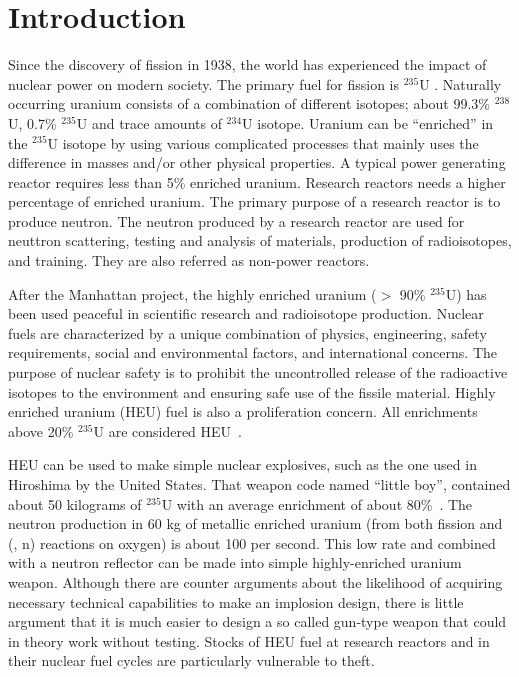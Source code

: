 \chapter{Introduction}
Since the discovery of fission in 1938, the world has experienced the impact of nuclear power on modern society. The primary fuel for fission is $^{235}$U . Naturally occurring uranium consists of a combination of different isotopes; about 99.3\% $^{238}$U,  0.7\% $^{235}$U and trace amounts of $^{234}$U isotope. Uranium can be ``enriched'' in the $^{235}$U isotope by using various complicated processes that mainly uses the difference in masses and/or other physical properties. A typical power generating reactor requires less than 5\% enriched uranium. Research reactors needs a higher percentage of enriched uranium. The primary purpose of a research reactor is to produce neutron. The neutron produced by a research reactor are used for neuttron scattering, testing and analysis of materials, production of radioisotopes, and training.
 They are also referred as non-power reactors.


After the Manhattan project, the highly enriched uranium ($>$ 90\% $^{235}$U) has been used peaceful in scientific research and radioisotope production. Nuclear fuels are characterized by a unique combination of physics, engineering, safety requirements, social and environmental factors, and international concerns. The purpose of nuclear safety is to prohibit the uncontrolled release of the radioactive isotopes to the environment and ensuring safe use of the fissile material. Highly enriched uranium (HEU) fuel is also a proliferation concern. All enrichments above 20\% $^{235}$U are considered HEU~\cite{international2005iaea}.

HEU can be used to make simple nuclear explosives, such as the one used in Hiroshima by the United States. That weapon code named ``little boy'', contained about 50 kilograms of $^{235}$U with an average enrichment of about 80\%~\cite{serber1992alamos}. The neutron production in 60 kg of metallic enriched uranium (from both fission and (\textalpha, n) reactions on oxygen) is about 100 per second. This low rate and combined with a neutron reflector can be made into simple highly-enriched uranium weapon. Although there are counter arguments about the likelihood of acquiring necessary technical capabilities to make an implosion design, there is little argument that it is much easier to design a so called gun-type weapon that could in theory work without testing. Stocks of HEU fuel at research reactors and in their nuclear fuel cycles are particularly vulnerable to theft.

